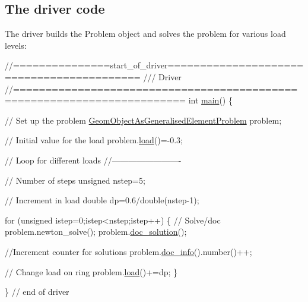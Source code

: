 \hypertarget{index_main}{}\subsection{The driver code}\label{index_main}
The driver builds the {\ttfamily Problem} object and solves the problem for various load levels\+:

 
\begin{DoxyCodeInclude}
\textcolor{comment}{//===============start\_of\_driver==========================================}
\textcolor{comment}{/// Driver }
\textcolor{comment}{}\textcolor{comment}{//========================================================================}
\textcolor{keywordtype}{int} \hyperlink{algebraic__free__boundary__poisson_8cc_a0ddf1224851353fc92bfbff6f499fa97}{main}()
\{

 \textcolor{comment}{// Set up the problem }
 \hyperlink{classGeomObjectAsGeneralisedElementProblem}{GeomObjectAsGeneralisedElementProblem} problem;
 
 \textcolor{comment}{// Initial value for the load }
 problem.\hyperlink{classGeomObjectAsGeneralisedElementProblem_a5ae799de23742e4c8fa54ee7ae32e679}{load}()=-0.3;
 
 \textcolor{comment}{// Loop for different loads}
 \textcolor{comment}{//-------------------------}
 
 \textcolor{comment}{// Number of steps}
 \textcolor{keywordtype}{unsigned} nstep=5;
 
 \textcolor{comment}{// Increment in load}
 \textcolor{keywordtype}{double} dp=0.6/double(nstep-1);
 
 \textcolor{keywordflow}{for} (\textcolor{keywordtype}{unsigned} istep=0;istep<nstep;istep++)
  \{    
   \textcolor{comment}{// Solve/doc}
   problem.newton\_solve();
   problem.\hyperlink{classGeomObjectAsGeneralisedElementProblem_a5092be8e6172d6c9147115bdd485db35}{doc\_solution}();
   
   \textcolor{comment}{//Increment counter for solutions }
   problem.\hyperlink{classGeomObjectAsGeneralisedElementProblem_a4be869d81c0df187d4239a590826f139}{doc\_info}().number()++;    
   
   \textcolor{comment}{// Change load on ring}
   problem.\hyperlink{classGeomObjectAsGeneralisedElementProblem_a5ae799de23742e4c8fa54ee7ae32e679}{load}()+=dp;
  \} 
 
\} \textcolor{comment}{// end of driver}

\end{DoxyCodeInclude}




